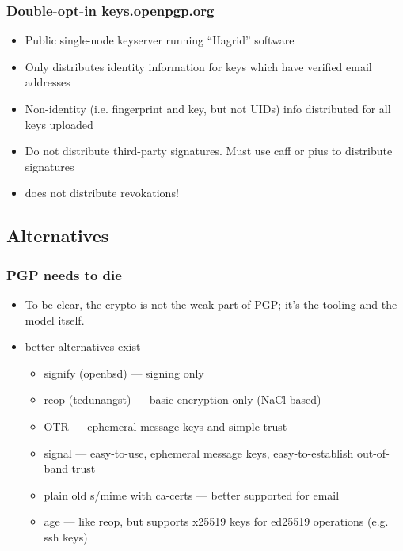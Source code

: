 \documentclass[aspectratio=1610,bigger,utf8]{beamer}
\begin{document}
\begin{frame}
	\frametitle{Double-opt-in \url{keys.openpgp.org}}
	\begin{itemize}
		\item Public single-node keyserver running ``Hagrid'' software
		\item Only distributes identity information for keys which have
			verified email addresses
		\item Non-identity (i.e. fingerprint and key, but not UIDs)
			info distributed for all keys uploaded
		\item Do not distribute third-party signatures. Must use
			\alert{caff} or \alert{pius} to distribute signatures
		\item does not distribute revokations!
	\end{itemize}
\end{frame}

\subsection{Alternatives}

\begin{frame}
	\frametitle{PGP needs to die}
	\begin{itemize}
		\item To be clear, the \alert{crypto} is not the weak part of
			PGP; it's the tooling and the model itself.
		\item better alternatives exist\pause
			\begin{itemize}
				\item signify (openbsd) --- signing only
				\item reop (tedunangst) --- basic encryption only (NaCl-based)
				\item OTR --- ephemeral message keys and simple trust
				\item signal --- easy-to-use, ephemeral message
					keys, easy-to-establish out-of-band
					trust
				\item plain old s/mime with ca-certs --- better
					supported for email
				\item age --- like reop, but supports x25519
					keys for ed25519 operations (e.g. ssh
					keys)
			\end{itemize}
	\end{itemize}
\end{frame}
\end{document}
